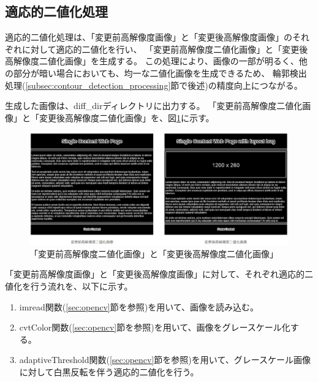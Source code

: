 \subsection{適応的二値化処理}\label{subsec:Adaptive_Binarisation}
適応的二値化処理は、「変更前高解像度画像」と「変更後高解像度画像」のそれぞれに対して適応的二値化を行い、
「変更前高解像度二値化画像」と「変更後高解像度二値化画像」を生成する。
この処理により、画像の一部が明るく、他の部分が暗い場合においても、均一な二値化画像を生成できるため、
輪郭検出処理(\ref{subsec:contour_detection_processing}節で後述)の精度向上につながる。

生成した画像は、diff\_dirディレクトリに出力する。
「変更前高解像度二値化画像」と「変更後高解像度二値化画像」を、図\ref{fig: img_high_bin_bf_af}に示す。
\begin{figure}[tp]
    \begin{center}
        \includegraphics[width=1.0\columnwidth]{image/4_img_high_bin_bf_af.png}
        \caption{「変更前高解像度二値化画像」と「変更後高解像度二値化画像」}
        \label{fig: img_high_bin_bf_af}
    \end{center}
\end{figure}
\par
「変更前高解像度画像」と「変更後高解像度画像」に対して、それぞれ適応的二値化を行う流れを、以下に示す。
\begin{enumerate}
    \item imread関数(\ref{sec:opencv}節を参照)を用いて、画像を読み込む。
    \item cvtColor関数(\ref{sec:opencv}節を参照)を用いて、画像をグレースケール化する。
    \item adaptiveThreshold関数(\ref{sec:opencv}節を参照)を用いて、グレースケール画像に対して白黒反転を伴う適応的二値化を行う。
\end{enumerate}

